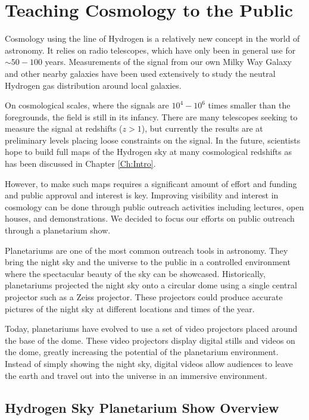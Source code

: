 \chapter{Teaching \cm Cosmology to the Public}\label{Ch:Planet}

Cosmology using the \cm line of Hydrogen is a relatively new concept in the world of astronomy. It relies on radio telescopes, which have only been in general use for $\sim 50-100$ years. Measurements of the \cm signal from our own Milky Way Galaxy and other nearby galaxies have been used extensively to study the neutral Hydrogen gas distribution around local galaxies. 

On cosmological scales, where the \cm signals are $10^4 - 10^6$ times smaller than the foregrounds, the field is still in its infancy. There are many telescopes seeking to measure the \cm signal at redshifts ($z>1$), but currently the results are at preliminary levels placing loose constraints on the signal. In the future, scientists hope to build full maps of the Hydrogen sky at many cosmological redshifts as has been discussed in Chapter \ref{Ch:Intro}. 

However, to make such maps requires a significant amount of effort and funding and public approval and interest is key. Improving visibility and interest in \cm cosmology can be done through public outreach activities including lectures, open houses, and demonstrations. We decided to focus our efforts on public outreach through a planetarium show. 

Planetariums are one of the most common outreach tools in astronomy. They bring the night sky and the universe to the public in a controlled environment where the spectacular beauty of the sky can be showcased. Historically, planetariums projected the night sky onto a circular dome using a single central projector such as a Zeiss projector. These projectors could produce accurate pictures of the night sky at different locations and times of the year.

Today, planetariums have evolved to use a set of video projectors placed around the base of the dome. These video projectors display digital stills and videos on the dome, greatly increasing the potential of the planetarium environment. Instead of simply showing the night sky, digital videos allow audiences to leave the earth and travel out into the universe in an immersive environment. 



\section{Hydrogen Sky Planetarium Show Overview}

